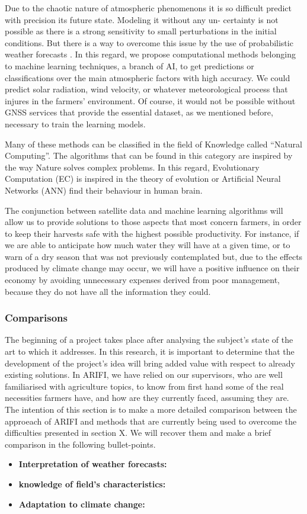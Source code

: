 Due to the chaotic nature of atmospheric phenomenons it is so difficult predict with precision its future state. Modeling it without any un- certainty is not possible as there is a strong sensitivity to small perturbations in the initial conditions. But there is a way to overcome this issue by the use of probabilistic weather forecasts \cite{martinez2015forecasting}. In this regard, we propose computational methods belonging to machine learning techniques, a branch of AI, to get predictions or classifications over the main atmospheric factors with high accuracy. We could predict solar radiation, wind velocity, or whatever meteorological process that injures in the farmers' environment. Of course, it would not be possible without GNSS services that provide the essential dataset, as we mentioned before, necessary to train the learning models.

Many of these methods can be classified in the field of Knowledge called “Natural Computing”. The algorithms that can be found in this category are inspired by the way Nature solves complex problems. In this regard, Evolutionary Computation (EC) is inspired in the theory of evolution or Artificial Neural Networks (ANN) find their behaviour in human brain.

The conjunction between satellite data and machine learning algorithms will allow us to provide solutions to those aspects that most concern farmers, in order to keep their harvests safe with the highest possible productivity. For instance, if we are able to anticipate how much water they will have at a given time, or to warn of a dry season that was not previously contemplated but, due to the effects produced by climate change may occur, we will have a positive influence on their economy by avoiding unnecessary expenses derived from poor management, because they do not have all the information they could.

\subsubsection{Comparisons}	
The beginning of a project takes place after analysing the subject's state of the art to which it addresses. In this research, it is important to determine that the development of the project's idea will bring added value with respect to already existing solutions. In ARIFI, we have relied on our supervisors, who are well familiarised with agriculture topics, to know from first hand some of the real necessities farmers have, and how are they currently faced, assuming they are. The intention of this section is to make a more detailed comparison between the approeach of ARIFI and methods that are currently being used to overcome the difficulties presented in section X. We will recover them and make a brief comparison in the following bullet-points. 
\begin{itemize}
    \item \textbf{Interpretation of weather forecasts:} 
    \item \textbf{knowledge of field's characteristics:} 
    \item \textbf{Adaptation to climate change:} 
\end{itemize}

